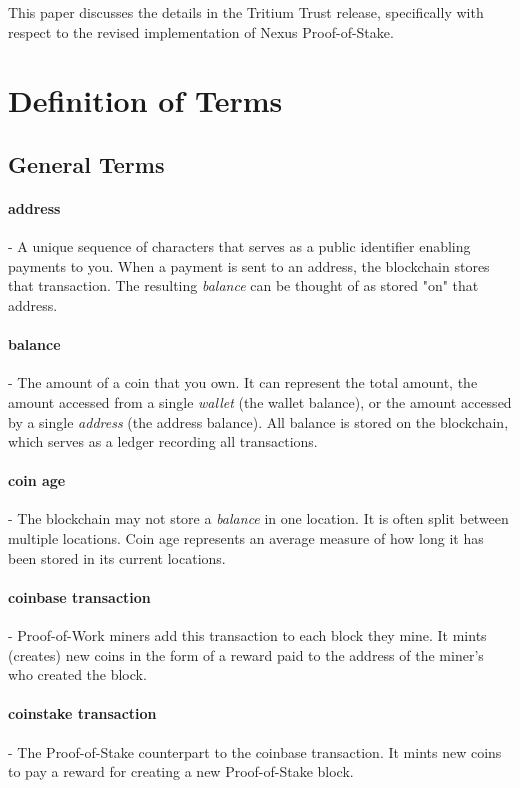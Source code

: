 \documentclass[11pt]{article}
\begin{document}
\noindent This paper discusses the details in the Tritium Trust release, specifically with respect to the revised implementation of Nexus Proof-of-Stake.

\bigskip

\section{Definition of Terms}

\subsection{General Terms}

\paragraph{address}- A unique sequence of characters that serves as a public identifier enabling payments to you. When a payment is sent to an address, the blockchain stores that transaction. The resulting \textit{balance} can be thought of as stored "on" that address.

\paragraph{balance}- The amount of a coin that you own. It can represent the total amount, the amount accessed from a single \textit{wallet} (the wallet balance), or the amount accessed by a single \textit{address} (the address balance). All balance is stored on the blockchain, which serves as a ledger recording all transactions. 

\paragraph{coin age}- The blockchain may not store a \textit{balance} in one location. It is often split between multiple locations. Coin age represents an average measure of how long it has been stored in its current locations.  

\paragraph{coinbase transaction}- Proof-of-Work miners add this transaction to each block they mine. It mints (creates) new coins in the form of a reward paid to the address of the miner's who created the block.

\paragraph{coinstake transaction}- The Proof-of-Stake counterpart to the coinbase transaction. It mints new coins to pay a reward for creating a new Proof-of-Stake block.
\end{document}
